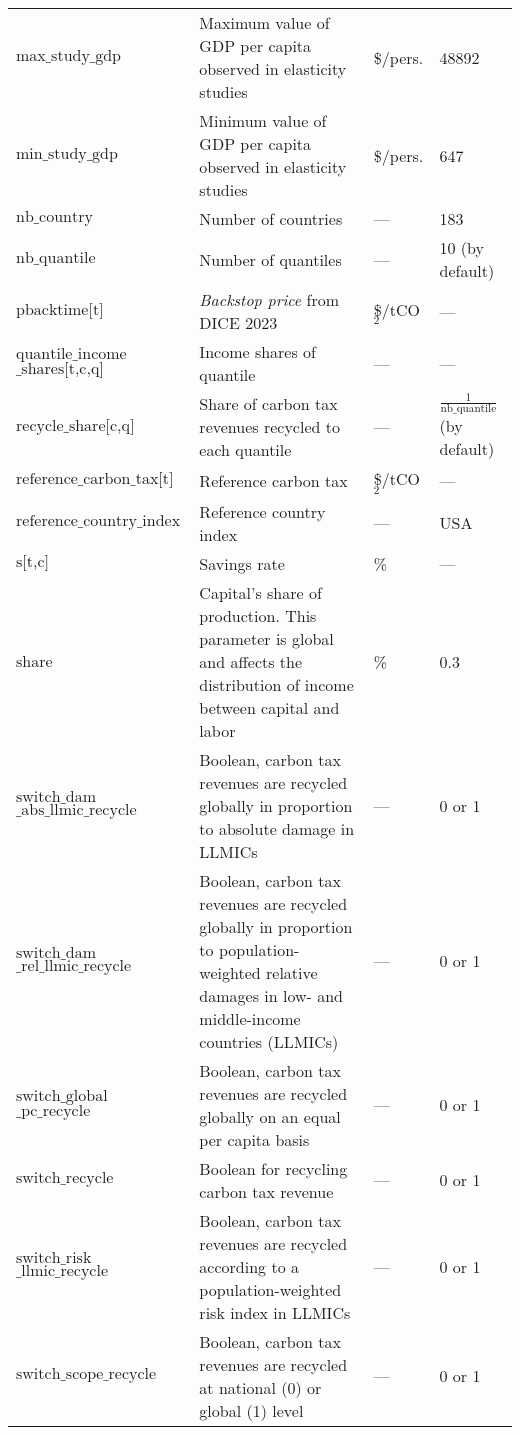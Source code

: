 \documentclass[
]{article}
\begin{document}
\begin{longtable}{|p{1.5in}|p{2.5in}|p{0.9in}|p{0.7in}|}
  \(\text{max\_study\_gdp}\) & Maximum value of GDP per capita observed in elasticity studies & \$/pers. & 48892 \\
  \(\text{min\_study\_gdp}\) & Minimum value of GDP per capita observed in elasticity studies & \$/pers. & 647 \\
  \(\text{nb\_country}\) & Number of countries & — & 183 \\
  \(\text{nb\_quantile}\) & Number of quantiles & — & 10 (by default) \\
  \(\text{pbacktime[t]}\) & \emph{Backstop price} from DICE 2023 & \$/tCO$_2$ & — \\
  \(\text{quantile\_income}\) \(\text{\_shares[t,c,q]}\) & Income shares of quantile & — & — \\
  \(\text{recycle\_share[c,q]}\) & Share of carbon tax revenues recycled to each quantile & — & $\frac{1}{\mbox{nb\_quantile}}$ (by default)\\
  \(\text{reference\_carbon\_tax[t]}\) & Reference carbon tax & \$/tCO$_2$ & — \\
  \(\text{reference\_country\_index}\) & Reference country index & — & USA \\
  \(\text{s[t,c]}\) & Savings rate & \% & — \\
  \(\text{share}\) & Capital's share of production. This parameter is global and affects the distribution of income between capital and labor & \% & 0.3 \\
  \(\text{switch\_dam}\) \(\text{\_abs\_llmic\_recycle}\) & Boolean, carbon tax revenues are recycled globally in proportion to absolute damage in LLMICs & — & 0 or 1 \\
  \(\text{switch\_dam}\) \(\text{\_rel\_llmic\_recycle}\) & Boolean, carbon tax revenues are recycled globally in proportion to population-weighted relative damages in low- and middle-income countries (LLMICs) & — & 0 or 1 \\
  \(\text{switch\_global}\) \(\text{\_pc\_recycle}\) & Boolean, carbon tax revenues are recycled globally on an equal per capita basis & — & 0 or 1 \\
  \(\text{switch\_recycle}\) & Boolean for recycling carbon tax revenue & — & 0 or 1 \\
  \(\text{switch\_risk}\) \(\text{\_llmic\_recycle}\) & Boolean, carbon tax revenues are recycled according to a population-weighted risk index in LLMICs & — & 0 or 1 \\
  \(\text{switch\_scope\_recycle}\) & Boolean, carbon tax revenues are recycled at national (0) or global (1) level & — & 0 or 1 \\

\end{longtable}
\end{document}
